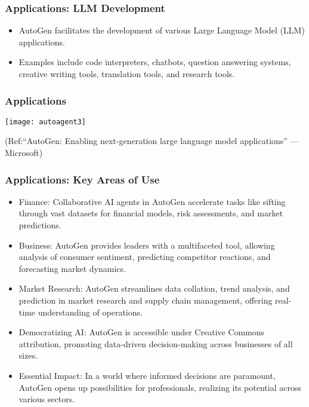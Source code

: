 \begin{frame}[fragile]\frametitle{Applications: LLM Development}
  \begin{itemize}
    \item AutoGen facilitates the development of various Large Language Model (LLM) applications.
    \item Examples include code interpreters, chatbots, question answering systems, creative writing tools, translation tools, and research tools.
  \end{itemize}
\end{frame}

\begin{frame}[fragile]\frametitle{Applications}
	
	\begin{center}
	\texttt{[image: autoagent3]}
	\end{center}
	
{\tiny (Ref:“AutoGen: Enabling next-generation large language model applications” — Microsoft)}
\end{frame}

\begin{frame}[fragile]\frametitle{Applications: Key Areas of Use}
  \begin{itemize}
    \item Finance: Collaborative AI agents in AutoGen accelerate tasks like sifting through vast datasets for financial models, risk assessments, and market predictions.
    \item Business: AutoGen provides leaders with a multifaceted tool, allowing analysis of consumer sentiment, predicting competitor reactions, and forecasting market dynamics.
    \item Market Research: AutoGen streamlines data collation, trend analysis, and prediction in market research and supply chain management, offering real-time understanding of operations.
    \item Democratizing AI: AutoGen is accessible under Creative Commons attribution, promoting data-driven decision-making across businesses of all sizes.
    \item Essential Impact: In a world where informed decisions are paramount, AutoGen opens up possibilities for professionals, realizing its potential across various sectors.
  \end{itemize}
\end{frame}


